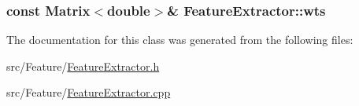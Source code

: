 \hypertarget{class_feature_extractor_a17a2527a302d35d02ed804166f08de42}{
\subsubsection[{wts}]{\setlength{\rightskip}{0pt plus 5cm}const {\bf Matrix}$<$double$>$\& Feature\+Extractor\+::wts\hspace{0.3cm}{\ttfamily [protected]}}}\label{class_feature_extractor_a17a2527a302d35d02ed804166f08de42}


The documentation for this class was generated from the following files\+:\begin{DoxyCompactItemize}
\item 
src/\+Feature/\hyperlink{_feature_extractor_8h}{Feature\+Extractor.\+h}\item 
src/\+Feature/\hyperlink{_feature_extractor_8cpp}{Feature\+Extractor.\+cpp}\end{DoxyCompactItemize}
